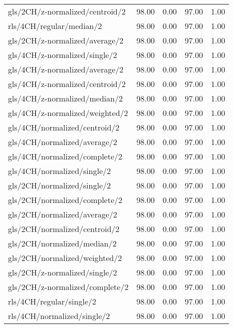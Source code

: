 \begin{longtable}{lrrrr}
    gls/2CH/z-normalized/centroid/2           & 98.00 &  0.00 & 97.00 &  1.00 \\
    rls/4CH/regular/median/2                  & 98.00 &  0.00 & 97.00 &  1.00 \\
    gls/2CH/z-normalized/average/2            & 98.00 &  0.00 & 97.00 &  1.00 \\
    gls/4CH/z-normalized/single/2             & 98.00 &  0.00 & 97.00 &  1.00 \\
    gls/4CH/z-normalized/average/2            & 98.00 &  0.00 & 97.00 &  1.00 \\
    gls/4CH/z-normalized/centroid/2           & 98.00 &  0.00 & 97.00 &  1.00 \\
    gls/4CH/z-normalized/median/2             & 98.00 &  0.00 & 97.00 &  1.00 \\
    gls/4CH/z-normalized/weighted/2           & 98.00 &  0.00 & 97.00 &  1.00 \\
    gls/4CH/normalized/centroid/2             & 98.00 &  0.00 & 97.00 &  1.00 \\
    gls/4CH/normalized/average/2              & 98.00 &  0.00 & 97.00 &  1.00 \\
    gls/4CH/normalized/complete/2             & 98.00 &  0.00 & 97.00 &  1.00 \\
    gls/4CH/normalized/single/2               & 98.00 &  0.00 & 97.00 &  1.00 \\
    gls/2CH/normalized/single/2               & 98.00 &  0.00 & 97.00 &  1.00 \\
    gls/2CH/normalized/complete/2             & 98.00 &  0.00 & 97.00 &  1.00 \\
    gls/2CH/normalized/average/2              & 98.00 &  0.00 & 97.00 &  1.00 \\
    gls/2CH/normalized/centroid/2             & 98.00 &  0.00 & 97.00 &  1.00 \\
    gls/2CH/normalized/median/2               & 98.00 &  0.00 & 97.00 &  1.00 \\
    gls/2CH/normalized/weighted/2             & 98.00 &  0.00 & 97.00 &  1.00 \\
    gls/2CH/z-normalized/single/2             & 98.00 &  0.00 & 97.00 &  1.00 \\
    gls/2CH/z-normalized/complete/2           & 98.00 &  0.00 & 97.00 &  1.00 \\
    rls/4CH/regular/single/2                  & 98.00 &  0.00 & 97.00 &  1.00 \\
    rls/4CH/normalized/single/2               & 98.00 &  0.00 & 97.00 &  1.00 \\

\end{longtable}
